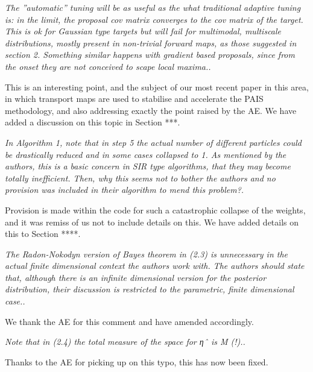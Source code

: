 \documentclass{article}
\newcommand{\comment}[2]{\vspace{0.6cm}{\bf Comment:} {\it #1.}

\vspace{0.3cm}{\bf Answer:} #2}
\begin{document}
\comment{The ”automatic” tuning will be as useful as the what traditional adaptive tuning is: in the limit, the proposal cov matrix converges to the cov matrix of the target. This is ok for Gaussian type targets but will fail for multimodal, multiscale distributions, mostly present in non-trivial forward maps, as those suggested in section 2. Something similar happens with gradient based proposals, since from the onset they are not conceived to scape local maxima.}{This is an interesting point, and the subject of our most recent paper in this area, in which transport maps are used to stabilise and accelerate the PAIS methodology, and also addressing exactly the point raised by the AE. We have added a discussion on this topic in Section ***.}

\comment{In Algorithm 1, note that in step 5 the actual number of different particles could be drastically reduced and in some cases collapsed to 1. As mentioned by the authors, this is a basic concern in SIR type algorithms, that they may become totally inefficient. Then, why this seems not to bother the authors and no provision was included in their algorithm to mend this problem?}{Provision is made within the code for such a catastrophic collapse of the weights, and it was remiss of us not to include details on this. We have added details on this to Section ****.}

\comment{The Radon-Nokodyn version of Bayes theorem in (2.3) is unnecessary in the actual finite dimensional context the authors work with. The authors should state that, although there is an infinite dimensional version for the posterior distribution, their discussion is restricted to the parametric, finite dimensional case.}{We thank the AE for this comment and have amended accordingly.}

\comment{Note that in (2.4) the total measure of the space for ηˆ is M (!).}{Thanks to the AE for picking up on this typo, this has now been fixed.}
\end{document}
